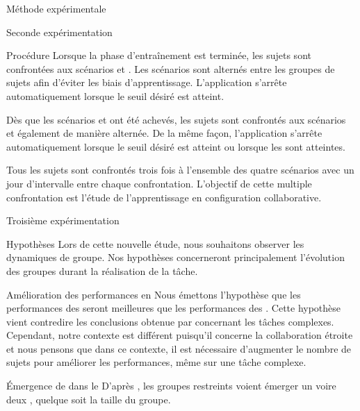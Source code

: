 \documentclass[myfrancais,ngerman,english,frenchb]{mythesis}
\begin{document}
\begin{mychapter}{Méthode expérimentale}
\begin{mysection}{Seconde expérimentation}
\begin{mysubsection}{Procédure}
				Lorsque la phase d'entraînement est terminée, les sujets sont confrontées aux scénarios  et .
				Les scénarios sont alternés entre les groupes de sujets afin d'éviter les biais d'apprentissage.
				L'application s'arrête automatiquement lorsque le seuil  désiré est atteint.

				Dès que les scénarios  et  ont été achevés, les sujets sont confrontés aux scénarios  et  également de manière alternée.
				De la même façon, l'application s'arrête automatiquement lorsque le seuil  désiré est atteint ou lorsque les  sont atteintes.

				Tous les sujets sont confrontés trois fois à l'ensemble des quatre scénarios avec un jour d'intervalle entre chaque confrontation.
				L'objectif de cette multiple confrontation est l'étude de l'apprentissage en configuration collaborative.
			\end{mysubsection}
		\end{mysection}
		\begin{mysection}{Troisième expérimentation}
			\begin{mysubsection}{Hypothèses}
				Lors de cette nouvelle étude, nous souhaitons observer les dynamiques de groupe.
				Nos hypothèses concerneront principalement l'évolution des groupes durant la réalisation de la tâche.
				\begin{myparagraph}{ Amélioration des performances en }
					Nous émettons l'hypothèse que les performances des  seront meilleures que les performances des .
					Cette hypothèse vient contredire les conclusions obtenue par  concernant les tâches complexes.
					Cependant, notre contexte est différent puisqu'il concerne la collaboration étroite et nous pensons que dans ce contexte, il est nécessaire d'augmenter le nombre de sujets pour améliorer les performances, même sur une tâche complexe.
				\end{myparagraph}
				\begin{myparagraph}{ Émergence de  dans le }
					D'après , les groupes restreints voient émerger un voire deux , quelque soit la taille du groupe.

\end{myparagraph}
\end{mysubsection}
\end{mysection}
\end{mychapter}
\end{document}
